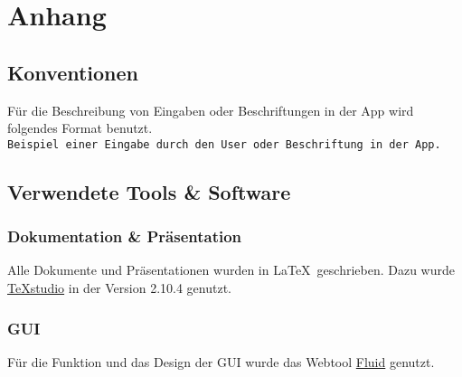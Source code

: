 \chapter{Anhang}

\section{Konventionen}

Für die Beschreibung von Eingaben oder Beschriftungen in der App wird folgendes Format benutzt. \\
{\color{IndianRed}\texttt{Beispiel einer Eingabe durch den User oder Beschriftung in der App.}}

\section{Verwendete Tools \& Software}

\subsection{Dokumentation \& Präsentation}

Alle Dokumente und Präsentationen wurden in \LaTeX \ geschrieben. Dazu wurde \href{http://texstudio.sourceforge.net}{TeXstudio} in der Version 2.10.4 genutzt. 

\subsection{GUI}

Für die Funktion und das Design der GUI wurde das Webtool \href{https://www.fluidui.com}{Fluid} genutzt.